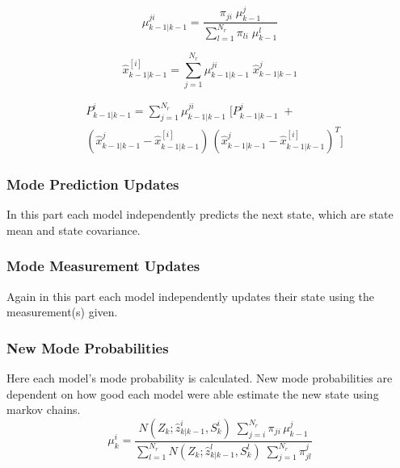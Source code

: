 \documentclass[peerreview]{IEEEtran}
\begin{document}
\begin{equation}
\mu_{k-1|k-1}^{ji} =
\frac
 {\pi_{ji} \; \mu_{k-1}^{j}}
 {\sum\limits_{l=1}^{N_{r}} \pi_{li} \; \mu_{k-1}^{l}}
\end{equation}

\begin{equation}
\hat{x}_{k-1|k-1}^{[i]} = \sum\limits_{j=1}^{N_{r}} \mu_{k-1|k-1}^{ji} \; \hat{x}_{k-1|k-1}^j
\end{equation}


\begin{equation}
\begin{aligned}
&P_{k-1|k-1}^{i} = \sum\limits_{j=1}^{N_{r}} \mu_{k-1|k-1}^{ji} \;  
[P_{k-1|k-1}^j \;+ \\ 
&( \hat{x}_{k-1|k-1}^j - \hat{x}_{k-1|k-1}^{[i]} ) \,
(\hat{x}_{k-1|k-1}^j - \hat{x}_{k-1|k-1}^{[i]})^T ]
\end{aligned}
\end{equation}



\vspace{10px}

\subsubsection{Mode Prediction Updates}
\vspace{10px}
In this part each model independently predicts the next state, which are state mean and state covariance.
\subsubsection{Mode Measurement Updates}
\vspace{10px}
Again in this part each model independently updates their state using the measurement(s) given.
\subsubsection{New Mode Probabilities}
\vspace{10px}
Here each model's mode probability is calculated. New mode probabilities are dependent on how good each model were able estimate the new state using markov chains.
\begin{equation}
\mu_k^i = \frac
{N(Z_k; \hat{z}_{k|k-1}^i, S_k^i) \; \sum\limits_{j=i}^{N_r} \pi_{ji}\,\mu_{k-1}^j }
{\sum\limits_{l=1}^{N_r} N(Z_k; \hat{z}_{k|k-1}^l, S_k^l) \; \sum\limits_{j=1}^{N_r} \pi_{jl}^j }
\end{equation}
\end{document}
